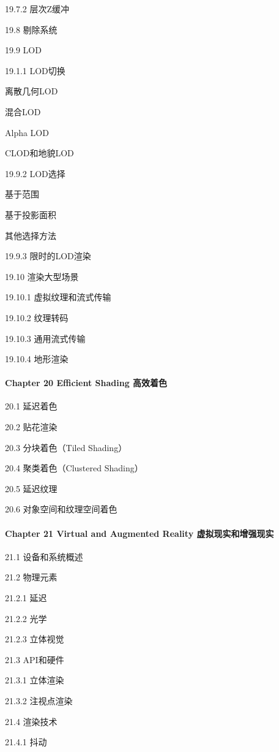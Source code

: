 \documentclass[
  paper=a4,
  ,captions=tableheading
]{scrartcl}
\begin{document}
19.7.2 层次Z缓冲

19.8 剔除系统

19.9 LOD

19.1.1 LOD切换

离散几何LOD

混合LOD

Alpha LOD

CLOD和地貌LOD

19.9.2 LOD选择

基于范围

基于投影面积

其他选择方法

19.9.3 限时的LOD渲染

19.10 渲染大型场景

19.10.1 虚拟纹理和流式传输

19.10.2 纹理转码

19.10.3 通用流式传输

19.10.4 地形渲染

\paragraph{Chapter 20 Efficient Shading
高效着色}\label{chapter-20-efficient-shading-ux9ad8ux6548ux7740ux8272}

20.1 延迟着色

20.2 贴花渲染

20.3 分块着色（Tiled Shading）

20.4 聚类着色（Clustered Shading）

20.5 延迟纹理

20.6 对象空间和纹理空间着色

\paragraph{Chapter 21 Virtual and Augmented Reality
虚拟现实和增强现实}\label{chapter-21-virtual-and-augmented-reality-ux865aux62dfux73b0ux5b9eux548cux589eux5f3aux73b0ux5b9e}

21.1 设备和系统概述

21.2 物理元素

21.2.1 延迟

21.2.2 光学

21.2.3 立体视觉

21.3 API和硬件

21.3.1 立体渲染

21.3.2 注视点渲染

21.4 渲染技术

21.4.1 抖动
\end{document}

